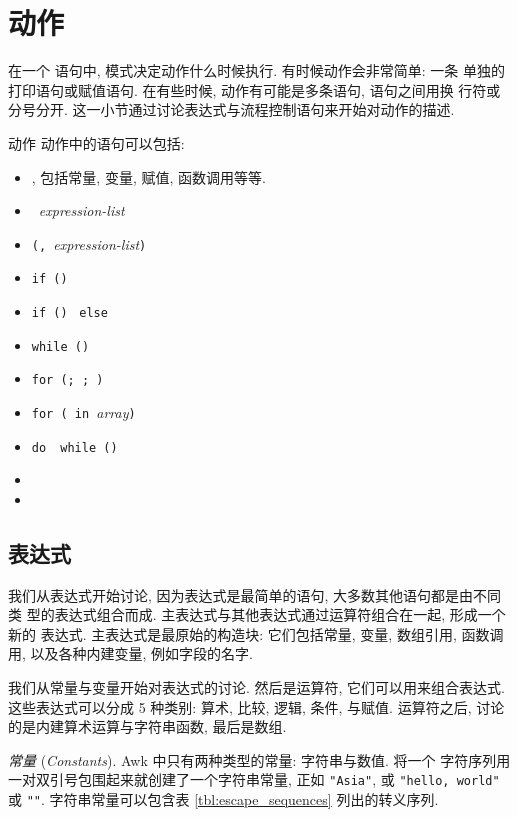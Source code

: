 \section{动作}
\label{sec:actions}

在一个 \patact 语句中, 模式决定动作什么时候执行. 有时候动作会非常简单: 一条
单独的打印语句或赋值语句. 在有些时候, 动作有可能是多条语句, 语句之间用换
行符或分号分开. 这一小节通过讨论表达式与流程控制语句来开始对动作的描述.
\begin{summary}{动作}
    动作中的语句可以包括:
    \begin{itemize}
\item[]     \expr, 包括常量, 变量, 赋值, 函数调用等等.
\item[]     \print\ \textit{expression-list}
\item[]     \printf\verb'('\fmt\verb', '\textit{expression-list}\verb')'
\item[]     \verb'if ('\expr\verb')' \stmt
\item[]     \verb'if ('\expr\verb')' \stmt\ \verb'else '\stmt
\item[]     \verb'while ('\expr\verb') '\stmt
\item[]     \verb'for ('\expr\verb'; '\expr\verb'; '\expr\verb') '\stmt
\item[]     \verb'for ('\expr\verb' in '\textit{array}\verb')' \stmt
\item[]     \verb'do '\stmt\ \verb'while ('\expr\verb')'
\item[]     \break
\item[]     \ctn
    \end{itemize}
\end{summary}

\subsection{表达式}
\label{subsec:expressions}

我们从表达式开始讨论, 因为表达式是最简单的语句, 大多数其他语句都是由不同类
型的表达式组合而成. 主表达式与其他表达式通过运算符组合在一起, 形成一个新的
表达式. 主表达式是最原始的构造块: 它们包括常量, 变量, 数组引用, 函数调用,
以及各种内建变量, 例如字段的名字.

我们从常量与变量开始对表达式的讨论. 然后是运算符, 它们可以用来组合表达式.
这些表达式可以分成 5 种类别: 算术, 比较, 逻辑, 条件, 与赋值. 运算符之后,
讨论的是内建算术运算与字符串函数, 最后是数组.

\emph{常量} (\emph{Constants}). Awk 中只有两种类型的常量: 字符串与数值.
将一个
字符序列用一对双引号包围起来就创建了一个字符串常量, 正如 \verb'"Asia"',
或 \verb'"hello, world"' 或 \verb'""'. 字符串常量可以包含表
\ref{tbl:escape_sequences} 列出的转义序列.

